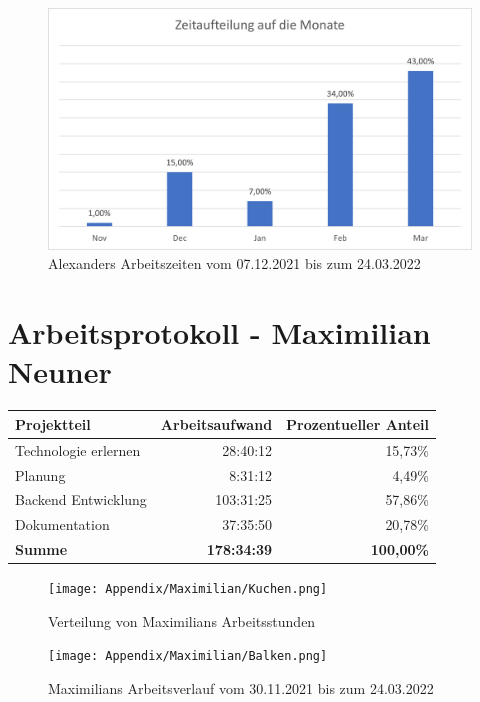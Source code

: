 \begin{figure}[H]
    \begin{center}
        \includegraphics[width=1\textwidth]{images/Zeiten/Zeitaufteilung-auf-Monate-Bertoni.png}
        \caption{Alexanders Arbeitszeiten vom 07.12.2021 bis zum 24.03.2022}
    \end{center}
\end{figure}

\newpage

\section*{Arbeitsprotokoll - Maximilian Neuner}

\begin{table}[H]
    \begin{tabular}{lrr}
        \hline
        \textbf{Projektteil} & \textbf{Arbeitsaufwand} & \textbf{Prozentueller Anteil} \\ \hline
        Technologie erlernen & 28:40:12                & 15,73\%                       \\
        Planung              & 8:31:12                 & 4,49\%                        \\
        Backend Entwicklung  & 103:31:25               & 57,86\%                       \\
        Dokumentation        & 37:35:50                & 20,78\%                       \\ \hline
        \textbf{Summe}       & \textbf{178:34:39}      & \textbf{100,00\%}             \\ \hline
    \end{tabular}
\end{table}

\begin{figure}[H]
    \begin{center}
        \texttt{[image: Appendix/Maximilian/Kuchen.png]}
        \caption{Verteilung von Maximilians Arbeitsstunden}
    \end{center}
\end{figure}

\begin{figure}[H]
    \begin{center}
        \texttt{[image: Appendix/Maximilian/Balken.png]}
        \caption{Maximilians Arbeitsverlauf vom 30.11.2021 bis zum 24.03.2022}
    \end{center}
\end{figure}
